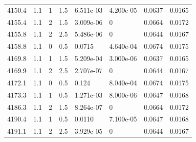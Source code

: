 \documentclass[preview]{standalone}
\begin{document}
{{{{{{{{{{{{{{{\begin{tabular}{L{1.2cm}C{1.2cm} C{0.3cm}C{0.5cm} C{1.4cm}C{1.4cm} C{1.4cm}C{1.4cm}}
  4150.4  &   1.1  & 1     & 1.5 &  6.511e-03  & 4.200e-05  & 0.0637 &  0.0165   \\ 
  4155.4  &   1.1  & 2     & 1.5 &  3.009e-06  & 0  & 0.0664 &  0.0172   \\ 
  4155.8  &   1.1  & 2     & 2.5 &  5.486e-06  & 0  & 0.0644 &  0.0167   \\ 
  4158.8  &   1.1  & 0     & 0.5 &  0.0715  & 4.640e-04  & 0.0674 &  0.0175   \\ 
  4169.8  &   1.1  & 1     & 1.5 &  5.209e-04  & 3.000e-06  & 0.0637 &  0.0165   \\ 
  4169.9  &   1.1  & 2     & 2.5 &  2.707e-07  & 0  & 0.0644 &  0.0167   \\ 
  4172.1  &   1.1  & 0     & 0.5 &  0.124  & 8.040e-04  & 0.0674 &  0.0175   \\ 
  4173.3  &   1.1  & 1     & 0.5 &  1.271e-03  & 8.000e-06  & 0.0647 &  0.0168   \\ 
  4186.3  &   1.1  & 2     & 1.5 &  8.264e-07  & 0  & 0.0664 &  0.0172   \\ 
  4190.4  &   1.1  & 1     & 0.5 &  0.0110  & 7.100e-05  & 0.0647 &  0.0168   \\ 
  4191.1  &   1.1  & 2     & 2.5 &  3.929e-05  & 0  & 0.0644 &  0.0167   \\ 
\hline 
\end{tabular} 

}}}}}}}}}}}}}}}
\end{document}
